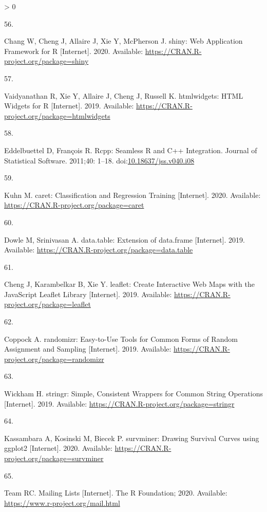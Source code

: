 \documentclass[10pt,letterpaper]{article}
\newlength{\csllabelwidth}
\newlength{\cslhangindent}
\newenvironment{CSLReferences}[3] %
 {%
  \setlength{\parindent}{0pt}
  \ifodd #1 \everypar{\setlength{\hangindent}{\cslhangindent}}\ignorespaces\fi
  \ifnum #2 > 0
  \setlength{\parskip}{#2\baselineskip}
  \fi
 }%
 {}
\newcommand{\CSLLeftMargin}[1]{\parbox[t]{\csllabelwidth}{#1}}
\newcommand{\CSLRightInline}[1]{\parbox[t]{\linewidth - \csllabelwidth}{#1}}
\begin{document}
\begin{CSLReferences}{0}{0}
\leavevmode\hypertarget{ref-shiny}{}%
\CSLLeftMargin{56. }
\CSLRightInline{Chang W, Cheng J, Allaire J, Xie Y, McPherson J. {shiny:
Web Application Framework for R} {[}Internet{]}. 2020. Available:
\url{https://CRAN.R-project.org/package=shiny}}

\leavevmode\hypertarget{ref-htmlwidgets}{}%
\CSLLeftMargin{57. }
\CSLRightInline{Vaidyanathan R, Xie Y, Allaire J, Cheng J, Russell K.
{htmlwidgets: HTML Widgets for R} {[}Internet{]}. 2019. Available:
\url{https://CRAN.R-project.org/package=htmlwidgets}}

\leavevmode\hypertarget{ref-Rcpp}{}%
\CSLLeftMargin{58. }
\CSLRightInline{Eddelbuettel D, François R. {Rcpp: Seamless R and C++
Integration}. Journal of Statistical Software. 2011;40: 1--18.
doi:\href{https://doi.org/10.18637/jss.v040.i08}{10.18637/jss.v040.i08}}

\leavevmode\hypertarget{ref-caret}{}%
\CSLLeftMargin{59. }
\CSLRightInline{Kuhn M. {caret: Classification and Regression Training}
{[}Internet{]}. 2020. Available:
\url{https://CRAN.R-project.org/package=caret}}

\leavevmode\hypertarget{ref-datatable}{}%
\CSLLeftMargin{60. }
\CSLRightInline{Dowle M, Srinivasan A. {data.table: Extension of
data.frame} {[}Internet{]}. 2019. Available:
\url{https://CRAN.R-project.org/package=data.table}}

\leavevmode\hypertarget{ref-leaflet}{}%
\CSLLeftMargin{61. }
\CSLRightInline{Cheng J, Karambelkar B, Xie Y. {leaflet: Create
Interactive Web Maps with the JavaScript Leaflet Library}
{[}Internet{]}. 2019. Available:
\url{https://CRAN.R-project.org/package=leaflet}}

\leavevmode\hypertarget{ref-randomizr}{}%
\CSLLeftMargin{62. }
\CSLRightInline{Coppock A. {randomizr: Easy-to-Use Tools for Common
Forms of Random Assignment and Sampling} {[}Internet{]}. 2019.
Available: \url{https://CRAN.R-project.org/package=randomizr}}

\leavevmode\hypertarget{ref-stringr}{}%
\CSLLeftMargin{63. }
\CSLRightInline{Wickham H. {stringr: Simple, Consistent Wrappers for
Common String Operations} {[}Internet{]}. 2019. Available:
\url{https://CRAN.R-project.org/package=stringr}}

\leavevmode\hypertarget{ref-survminer}{}%
\CSLLeftMargin{64. }
\CSLRightInline{Kassambara A, Kosinski M, Biecek P. {survminer: Drawing
Survival Curves using ggplot2} {[}Internet{]}. 2020. Available:
\url{https://CRAN.R-project.org/package=survminer}}

\leavevmode\hypertarget{ref-Rmail2020}{}%
\CSLLeftMargin{65. }
\CSLRightInline{Team RC. {Mailing Lists} {[}Internet{]}. The R
Foundation; 2020. Available: \url{https://www.r-project.org/mail.html}}


\end{CSLReferences}
\end{document}
